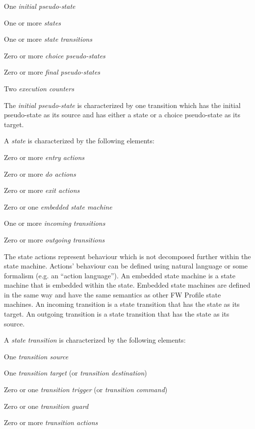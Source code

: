 \documentclass[a4paper,10pt]{article}
\newenvironment{fw_itemize}						%
{\begin{itemize}
  \setlength{\itemsep}{1mm}
  \setlength{\parskip}{0pt}
  \setlength{\parsep}{0pt}}
{\end{itemize}}
\begin{document}
\begin{fw_itemize} 
\item One \emph{initial pseudo-state}
\item One or more \emph{states}
\item One or more \emph{state transitions}
\item Zero or more \emph{choice pseudo-states}
\item Zero or more \emph{final pseudo-states}
\item Two \emph{execution counters}
\end{fw_itemize}

The \emph{initial pseudo-state} is characterized by one transition which has the initial pseudo-state as
its source and has either a state or a choice pseudo-state as its target.

A \emph{state} is characterized by the following elements:

\begin{fw_itemize} 
\item Zero or more \emph{entry actions}
\item Zero or more \emph{do actions}
\item Zero or more \emph{exit actions}
\item Zero or one \emph{embedded state machine}
\item One or more \emph{incoming transitions}
\item Zero or more \emph{outgoing transitions}
\end{fw_itemize}

The state actions represent behaviour which is not decomposed further within the state
machine. Actions' behaviour can be defined using natural language or some formalism (e.g. an
“action language”). An embedded state machine is a state machine that is embedded within the
state. Embedded state machines are defined in the same way and have the same semantics as
other FW Profile state machines. An incoming transition is a state transition that has the state
as its target. An outgoing transition is a state transition that has the state as its source.

A \emph{state transition} is characterized by the following elements:

\begin{fw_itemize} 
\item One \emph{transition source}
\item One \emph{transition target} (or \emph{transition destination})
\item Zero or one \emph{transition trigger} (or \emph{transition command})
\item Zero or one \emph{transition guard}
\item Zero or more \emph{transition actions}
 
\end{fw_itemize}
\end{document}
